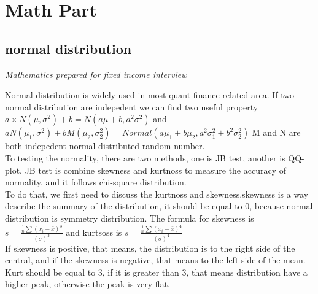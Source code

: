 \documentclass[a4paper,11pt]{article}
\begin{document}
\section{Math Part}
\subsection{normal distribution}
\begin{centering}
\em{Mathematics prepared for fixed income interview\\}
\end{centering}
Normal distribution is widely used in most quant finance related area. If two normal distribution are indepedent
we can find two useful property $a\times N(\mu, \sigma^2)+b=N(a\mu+b,a^2\sigma^2)$ and $aN(\mu_1,\sigma^2)+bM(\mu_2
,\sigma_2^2)=Normal(a\mu_1+b\mu_2,a^2\sigma_1^2+b^2\sigma_2^2)$ M and N are both indepedent normal distributed random number.\\
To testing the normality, there are two methods, one is JB test, another is QQ-plot. JB test is combine skewness and kurtnoss to measure the accuracy of normality, and it follows chi-square distribution. \\
To do that, we first need to discuss the kurtnoss and skewness.skewness is a way describe the summary of the distribution, it should be equal to 0, because normal distribution is symmetry distribution. The formula for skewness is $s=\frac{\frac{1}{n}\sum {(x_i-\bar{x})}^3}{(\sigma)^3}$ and kurtsoss is $s=\frac{\frac{1}{n}\sum {(x_i-\bar{x})}^4}{(\sigma)^4}$\\
If skewness is positive, that means, the distribution is to the right side of the central, and if the skewness is negative, that means to the left side of the mean. Kurt should be equal to 3, if it is greater than 3, that means distribution have a higher peak, otherwise the peak is very flat.
\end{document}
